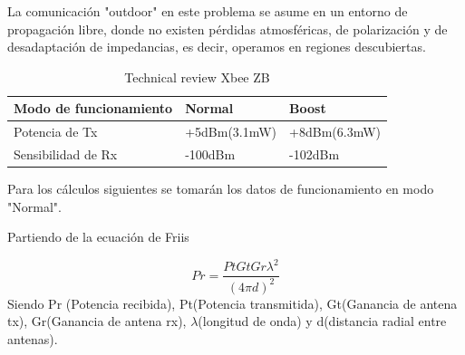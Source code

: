 \documentclass[11pt,oneside,spanish,a4paper]{article}
\begin{document}
 La comunicaci\'on "outdoor" en este problema se asume en un entorno de propagaci\'on libre, donde no existen p\'erdidas atmosf\'ericas, de polarizaci\'on y de desadaptaci\'on de impedancias, es decir, operamos en regiones descubiertas. 
 

\begin{table}[h]
\centering
\begin{tabular}{l l l}
\hline
\textbf{Modo de funcionamiento} & \textbf{Normal} & \textbf{Boost}\\
\hline
Potencia de Tx & +5dBm(3.1mW) & +8dBm(6.3mW) \\
Sensibilidad de Rx & -100dBm & -102dBm\\
\hline
\end{tabular}
\caption{Technical review Xbee ZB}
\end{table}
Para los c\'alculos siguientes se tomar\'an los datos de funcionamiento en modo "Normal".

Partiendo de la ecuaci\'on de Friis




\begin{equation*}
\label{Ec:Friis}
Pr = \frac{Pt Gt Gr \lambda ^{2}}{(4\pi d)^2}
\end{equation*}
Siendo Pr (Potencia recibida), Pt(Potencia transmitida), Gt(Ganancia de antena tx), Gr(Ganancia de antena rx), $\lambda$(longitud de onda) y d(distancia radial entre antenas).
\end{document}
